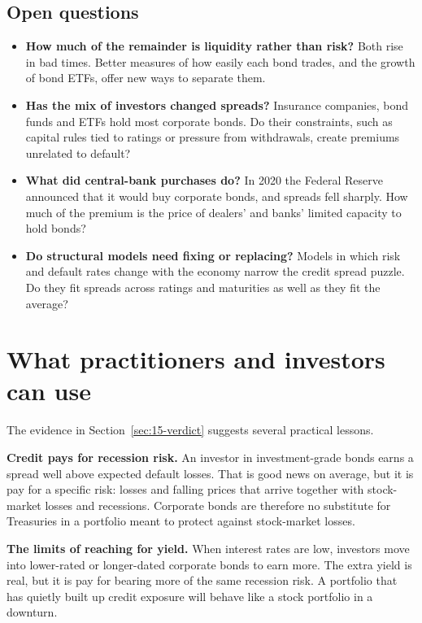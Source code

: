 \subsection{Open questions}
\label{sec:15-open}

\begin{itemize}
  \item \textbf{How much of the remainder is liquidity rather than risk?} Both rise in bad times. Better measures of how easily each bond trades, and the growth of bond ETFs, offer new ways to separate them.
  \item \textbf{Has the mix of investors changed spreads?} Insurance companies, bond funds and ETFs hold most corporate bonds. Do their constraints, such as capital rules tied to ratings or pressure from withdrawals, create premiums unrelated to default?
  \item \textbf{What did central-bank purchases do?} In 2020 the Federal Reserve announced that it would buy corporate bonds, and spreads fell sharply. How much of the premium is the price of dealers' and banks' limited capacity to hold bonds?
  \item \textbf{Do structural models need fixing or replacing?} Models in which risk and default rates change with the economy narrow the credit spread puzzle. Do they fit spreads across ratings and maturities as well as they fit the average?
\end{itemize}

\section{What practitioners and investors can use}
\label{sec:15-investors}

The evidence in Section~\ref{sec:15-verdict} suggests several practical lessons.

\textbf{Credit pays for recession risk.} An investor in investment-grade bonds earns a spread well above expected default losses. That is good news on average, but it is pay for a specific risk: losses and falling prices that arrive together with stock-market losses and recessions. Corporate bonds are therefore no substitute for Treasuries in a portfolio meant to protect against stock-market losses.

\textbf{The limits of reaching for yield.} When interest rates are low, investors move into lower-rated or longer-dated corporate bonds to earn more. The extra yield is real, but it is pay for bearing more of the same recession risk. A portfolio that has quietly built up credit exposure will behave like a stock portfolio in a downturn.

